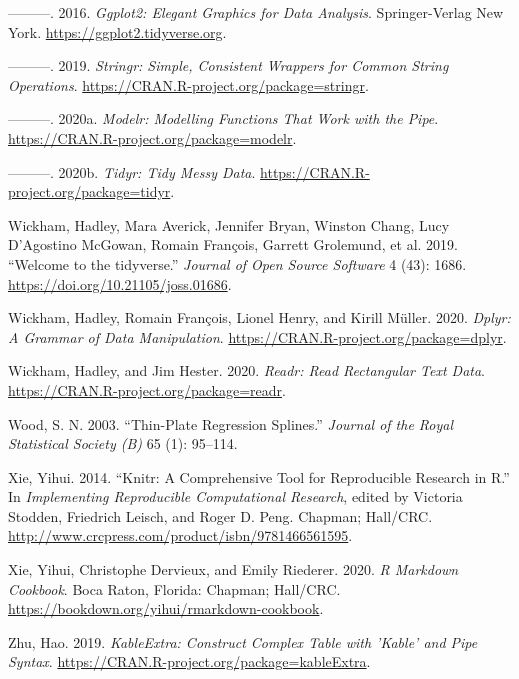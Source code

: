 \documentclass{article}
\begin{document}
\leavevmode\hypertarget{ref-ggplot2}{}%
---------. 2016. \emph{Ggplot2: Elegant Graphics for Data Analysis}. Springer-Verlag New York. \url{https://ggplot2.tidyverse.org}.

\leavevmode\hypertarget{ref-stringr}{}%
---------. 2019. \emph{Stringr: Simple, Consistent Wrappers for Common String Operations}. \url{https://CRAN.R-project.org/package=stringr}.

\leavevmode\hypertarget{ref-modelr}{}%
---------. 2020a. \emph{Modelr: Modelling Functions That Work with the Pipe}. \url{https://CRAN.R-project.org/package=modelr}.

\leavevmode\hypertarget{ref-tidyr}{}%
---------. 2020b. \emph{Tidyr: Tidy Messy Data}. \url{https://CRAN.R-project.org/package=tidyr}.

\leavevmode\hypertarget{ref-tidyverse}{}%
Wickham, Hadley, Mara Averick, Jennifer Bryan, Winston Chang, Lucy D'Agostino McGowan, Romain François, Garrett Grolemund, et al. 2019. ``Welcome to the tidyverse.'' \emph{Journal of Open Source Software} 4 (43): 1686. \url{https://doi.org/10.21105/joss.01686}.

\leavevmode\hypertarget{ref-dplyr}{}%
Wickham, Hadley, Romain François, Lionel Henry, and Kirill Müller. 2020. \emph{Dplyr: A Grammar of Data Manipulation}. \url{https://CRAN.R-project.org/package=dplyr}.

\leavevmode\hypertarget{ref-readr}{}%
Wickham, Hadley, and Jim Hester. 2020. \emph{Readr: Read Rectangular Text Data}. \url{https://CRAN.R-project.org/package=readr}.

\leavevmode\hypertarget{ref-mgcv}{}%
Wood, S. N. 2003. ``Thin-Plate Regression Splines.'' \emph{Journal of the Royal Statistical Society (B)} 65 (1): 95--114.

\leavevmode\hypertarget{ref-knitr}{}%
Xie, Yihui. 2014. ``Knitr: A Comprehensive Tool for Reproducible Research in R.'' In \emph{Implementing Reproducible Computational Research}, edited by Victoria Stodden, Friedrich Leisch, and Roger D. Peng. Chapman; Hall/CRC. \url{http://www.crcpress.com/product/isbn/9781466561595}.

\leavevmode\hypertarget{ref-rmarkdown}{}%
Xie, Yihui, Christophe Dervieux, and Emily Riederer. 2020. \emph{R Markdown Cookbook}. Boca Raton, Florida: Chapman; Hall/CRC. \url{https://bookdown.org/yihui/rmarkdown-cookbook}.

\leavevmode\hypertarget{ref-kableExtra}{}%
Zhu, Hao. 2019. \emph{KableExtra: Construct Complex Table with 'Kable' and Pipe Syntax}. \url{https://CRAN.R-project.org/package=kableExtra}.



\end{document}
